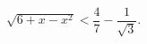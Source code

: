 \begin{ex}[type=inequality]
	\begin{condition}
		$\sqrt{6 + x - x^2}<\dfrac{4}{7} - \dfrac{1}{\sqrt{3}} .$
	\end{condition}
\end{ex}